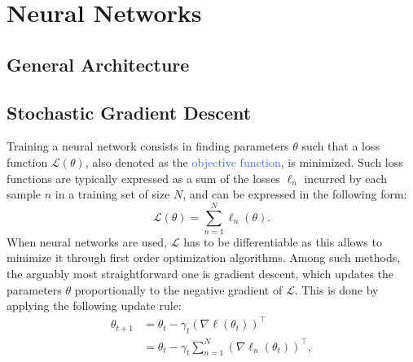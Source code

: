 \section{Neural Networks}
\label{sec:neural_networks}


\subsection{General Architecture}
\label{sec:general_architecture}

\subsection{Stochastic Gradient Descent}
\label{sec:sgd}

Training a neural network consists in finding parameters $\theta$ such that a loss function $\mathscr{L}(\theta)$, also denoted as the \textcolor{RoyalBlue}{objective function}, is minimized. Such loss functions are typically expressed as a sum of the losses $\ell_n$ incurred by each sample $n$ in a training set of size $N$, and can be expressed in the following form:
\begin{equation}
	\mathscr{L}(\theta) = \sum_{n=1}^{N}\ell_n(\theta).
	\label{eq:sum_of_losses}
\end{equation}
When neural networks are used, $\mathscr{L}$ has to be differentiable as this allows to minimize it through first order optimization algorithms. Among such methods, the arguably most straightforward one is gradient descent, which updates the parameters $\theta$ proportionally to the negative gradient of $\mathscr{L}$. This is done by applying the following update rule:
\begin{align}
	\theta_{t+1} & = \theta_t - \gamma_t(\nabla\ell(\theta_t))^{\intercal} \\ 
	& = \theta_t - \gamma_t \sum_{n=1}^{N}(\nabla \ell_n(\theta_t))^{\intercal},
	\label{eq:gradient_descent}
\end{align}
